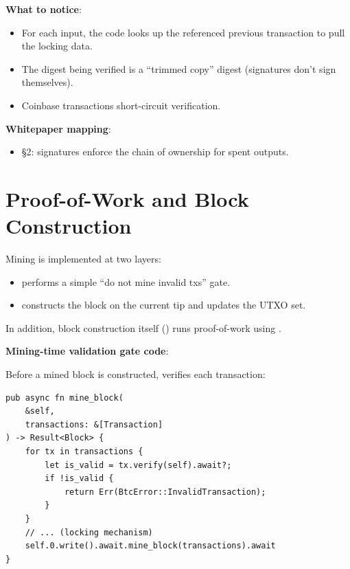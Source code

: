 \textbf{What to notice}:
\begin{itemize}
  \item For each input, the code looks up the referenced previous transaction to pull the locking data.
  \item The digest being verified is a ``trimmed copy'' digest (signatures don't sign themselves).
  \item Coinbase transactions short-circuit verification.
\end{itemize}

\textbf{Whitepaper mapping}:
\begin{itemize}
  \item \S2: signatures enforce the chain of ownership for spent outputs.
\end{itemize}

\section{Proof-of-Work and Block Construction}
\label{sec:ch09-7-pow}

Mining is implemented at two layers:

\begin{itemize}
  \item {} performs a simple ``do not mine invalid txs'' gate.
  \item {} constructs the block on the current tip and updates the UTXO set.
\end{itemize}

In addition, block construction itself () runs proof-of-work using .

\textbf{Mining-time validation gate code}: 

Before a mined block is constructed,  verifies each transaction:

\begin{listing}[htbp]
\caption{Mining-time validation gate ()}
\label{lst:9-7-2}
\begin{verbatim}
pub async fn mine_block(
    &self,
    transactions: &[Transaction]
) -> Result<Block> {
    for tx in transactions {
        let is_valid = tx.verify(self).await?;
        if !is_valid {
            return Err(BtcError::InvalidTransaction);
        }
    }
    // ... (locking mechanism)
    self.0.write().await.mine_block(transactions).await
}
\end{verbatim}
\end{listing}

